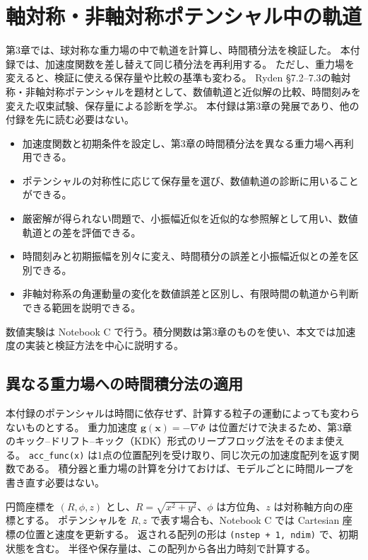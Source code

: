 \chapter{軸対称・非軸対称ポテンシャル中の軌道}
\label{app:orbit-applications}

第3章では、球対称な重力場の中で軌道を計算し、時間積分法を検証した。
本付録では、加速度関数を差し替えて同じ積分法を再利用する。
ただし、重力場を変えると、検証に使える保存量や比較の基準も変わる。
Ryden §7.2--7.3\cite{ryden2025}の軸対称・非軸対称ポテンシャルを題材として、数値軌道と近似解の比較、時間刻みを変えた収束試験、保存量による診断を学ぶ。
本付録は第3章の発展であり、他の付録を先に読む必要はない。

\begin{learningbox}[本付録で学ぶこと]
\begin{itemize}
 \item 加速度関数と初期条件を設定し、第3章の時間積分法を異なる重力場へ再利用できる。
 \item ポテンシャルの対称性に応じて保存量を選び、数値軌道の診断に用いることができる。
 \item 厳密解が得られない問題で、小振幅近似を近似的な参照解として用い、数値軌道との差を評価できる。
 \item 時間刻みと初期振幅を別々に変え、時間積分の誤差と小振幅近似との差を区別できる。
 \item 非軸対称系の角運動量の変化を数値誤差と区別し、有限時間の軌道から判断できる範囲を説明できる。
\end{itemize}
\end{learningbox}

数値実験は Notebook C で行う。積分関数は第3章のものを使い、本文では加速度の実装と検証方法を中心に説明する。

\section{異なる重力場への時間積分法の適用}
\label{sec:appC-reuse}

本付録のポテンシャルは時間に依存せず、計算する粒子の運動によっても変わらないものとする。
重力加速度 $\boldsymbol g(\boldsymbol x)=-\nabla\Phi$ は位置だけで決まるため、第3章のキック--ドリフト--キック（KDK）形式のリープフロッグ法をそのまま使える。
\texttt{acc\_func(x)} は1点の位置配列を受け取り、同じ次元の加速度配列を返す関数である。
積分器と重力場の計算を分けておけば、モデルごとに時間ループを書き直す必要はない。

円筒座標を $(R,\phi,z)$ とし、$R=\sqrt{x^2+y^2}$、$\phi$ は方位角、$z$ は対称軸方向の座標とする。
ポテンシャルを $R,z$ で表す場合も、Notebook C では Cartesian 座標の位置と速度を更新する。
返される配列の形は \texttt{(nstep + 1, ndim)} で、初期状態を含む。
半径や保存量は、この配列から各出力時刻で計算する。

